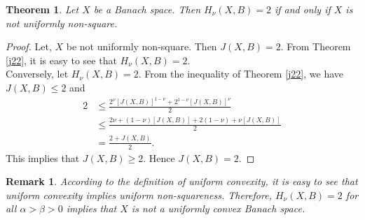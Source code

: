 \documentclass[preprint,12pt]{elsarticle}
\newtheorem{theorem}{Theorem}[section]
\newtheorem{rem}[thm]{Remark}
\newtheorem{remark}[thm]{Remark}
\numberwithin{equation}{section}
\begin{document}
\begin{theorem}\label{j3}
Let $X$ be a Banach space. Then $H_{\nu}(X,B)=2$
 if and only if $X$ is not uniformly non-square.
\end{theorem}
\begin{proof}
Let, $X$ be not uniformly non-square. Then $J(X,B)=2$. From Theorem \ref{j22}, it is easy to see that $H_\nu(X,B)=2$.\\
Conversely, let $H_\nu(X,B)=2$. From the inequality of Theorem \ref{j22}, we have $J(X,B)\leq2$ and 
\begin{align*}
 2&\leq\frac{2^\nu[J(X,B)]^{1-\nu}+2^{1-\nu}[J(X,B)]^{\nu}}{2}\\
 &\leq \frac{2\nu+(1-\nu)[J(X,B)]+2(1-\nu)+\nu[J(X,B)]}{2}\\
 &=\frac{2+J(X,B)}{2}.
\end{align*}
This implies that $J(X,B)\geq 2$. Hence $J(X,B)=2$.
\end{proof}
\begin{rem}
    According to the definition of uniform convexity, it is easy to see that uniform convexity implies uniform non-squareness. Therefore, $H_{\nu}(X,B)=2$ for all $\alpha>\beta>0$ implies that $X$ is not a uniformly convex Banach space.
\end{rem}
\end{document}
